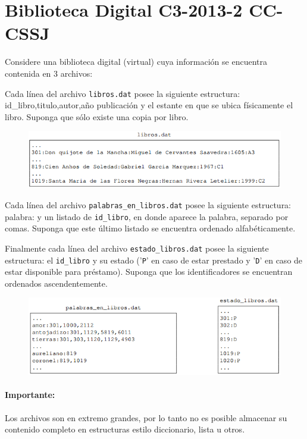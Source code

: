 \section{Biblioteca Digital C3-2013-2 CC-CSSJ}

Considere una biblioteca digital (virtual) cuya información se encuentra contenida en 3 archivos:

Cada línea del archivo \texttt{libros.dat} posee la siguiente estructura: id\_libro,titulo,autor,año publicación y el estante en que se ubica físicamente el libro. Suponga que sólo existe una copia por libro.

\begin{figure}[h]
    \centering
    \includegraphics{Imagenes/libros.png}
\end{figure}

Cada línea del archivo \texttt{palabras\_en\_libros.dat} posee la siguiente estructura: palabra: y un listado de \texttt{id\_libro}, en donde aparece la palabra, separado por comas. Suponga que este último listado se encuentra ordenado alfabéticamente.

Finalmente cada línea del archivo \texttt{estado\_libros.dat} posee la siguiente estructura: el \texttt{id\_libro} y su estado ('\texttt{P}' en caso de estar prestado y '\texttt{D}' en caso de estar disponible para préstamo).
Suponga que los identificadores se encuentran ordenados ascendentemente.

\begin{figure}[h]
    \centering
    \includegraphics{Imagenes/foto2.png}
\end{figure}

\paragraph{Importante:} Los archivos son en extremo grandes, por lo tanto no es posible almacenar su contenido completo en estructuras estilo diccionario, lista u otros.


